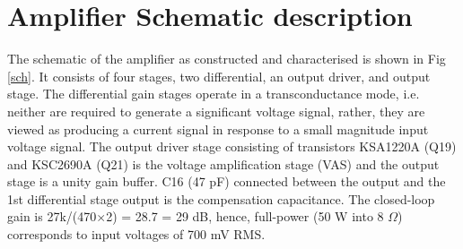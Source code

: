 \documentclass[a4paper,10pt, oneside]{article}
\begin{document}
\section{Amplifier Schematic description}\label{sec:description}
The schematic of the amplifier as constructed and characterised is shown in Fig \ref{sch}. 
It consists of four stages, two differential, an output driver, and output stage. The differential gain stages operate in a transconductance mode, i.e. neither are required to generate a significant voltage signal, rather, they are viewed as producing a current signal in response to a small magnitude input voltage signal. The output driver stage consisting of transistors KSA1220A (Q19) and KSC2690A (Q21) is the voltage amplification stage (VAS) and the output stage is a unity gain buffer. C16 (47 pF) connected between the output and the 1st differential stage output is the compensation capacitance. The closed-loop gain is 27k/(470$\times$2) = 28.7 = 29 dB, hence, full-power (50 W into 8 $\Omega$) corresponds to input voltages of 700 mV RMS. 
\end{document}

